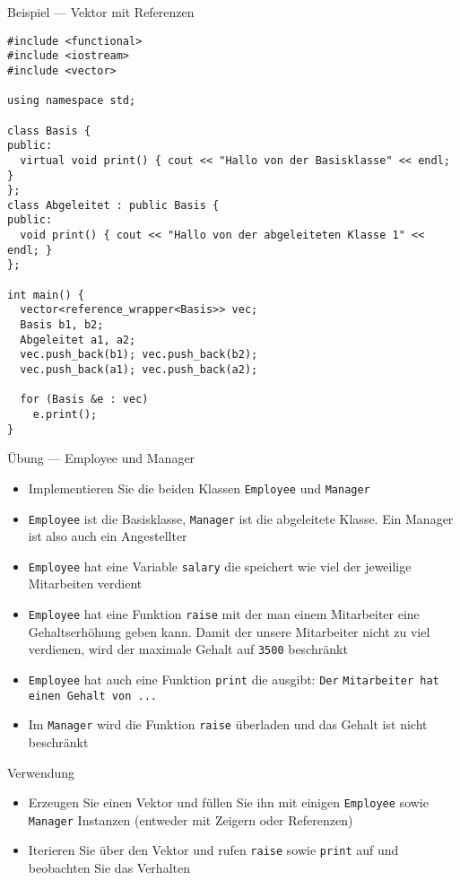 \documentclass[presentation]{beamer}
\begin{document}
\begin{frame}[label={sec:orgb704908},fragile]{Beispiel --- Vektor mit Referenzen}
 \begin{verbatim}
#include <functional>
#include <iostream>
#include <vector>

using namespace std;

class Basis {
public:
  virtual void print() { cout << "Hallo von der Basisklasse" << endl; }
};
class Abgeleitet : public Basis {
public:
  void print() { cout << "Hallo von der abgeleiteten Klasse 1" << endl; }
};

int main() {
  vector<reference_wrapper<Basis>> vec;
  Basis b1, b2;
  Abgeleitet a1, a2;
  vec.push_back(b1); vec.push_back(b2);
  vec.push_back(a1); vec.push_back(a2);

  for (Basis &e : vec)
    e.print();
}
\end{verbatim}
\end{frame}
\begin{frame}[label={sec:org4401701},fragile]{Übung --- Employee und Manager}
 \footnotesize
\begin{itemize}
\item Implementieren Sie die beiden Klassen {\color{solarizedYellow}\verb!Employee!} und {\color{solarizedYellow}\verb!Manager!}
\item {\color{solarizedYellow}\verb!Employee!} ist die Basisklasse, {\color{solarizedYellow}\verb!Manager!} ist die abgeleitete
Klasse. Ein Manager ist also auch ein Angestellter
\item {\color{solarizedYellow}\verb!Employee!} hat eine Variable {\color{solarizedYellow}\verb!salary!} die speichert wie viel der
jeweilige Mitarbeiten verdient
\item {\color{solarizedYellow}\verb!Employee!} hat eine Funktion {\color{solarizedYellow}\verb!raise!} mit der man einem Mitarbeiter
eine Gehaltserhöhung geben kann. Damit der unsere Mitarbeiter nicht
zu viel verdienen, wird der maximale Gehalt auf {\color{solarizedYellow}\verb!3500!} beschränkt
\item {\color{solarizedYellow}\verb!Employee!} hat auch eine Funktion {\color{solarizedYellow}\verb!print!} die ausgibt: {\color{solarizedYellow}\verb!Der!
  \verb!Mitarbeiter hat einen Gehalt von ...!}
\item Im {\color{solarizedYellow}\verb!Manager!} wird die Funktion {\color{solarizedYellow}\verb!raise!} überladen und das Gehalt ist
nicht beschränkt
\end{itemize}
\begin{block}{Verwendung}
\begin{itemize}
\item Erzeugen Sie einen Vektor und füllen Sie ihn mit einigen {\color{solarizedYellow}\verb!Employee!}
sowie {\color{solarizedYellow}\verb!Manager!} Instanzen (entweder mit Zeigern oder Referenzen)
\item Iterieren Sie über den Vektor und rufen {\color{solarizedYellow}\verb!raise!} sowie {\color{solarizedYellow}\verb!print!} auf
und beobachten Sie das Verhalten
\end{itemize}
\end{block}
\end{frame}
\end{document}
